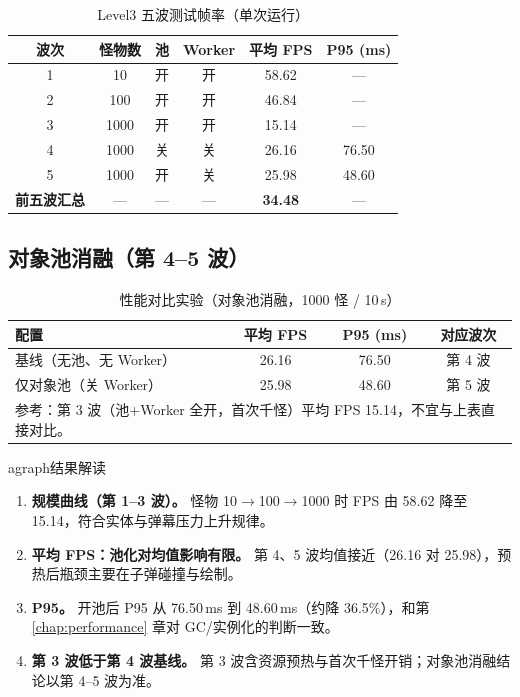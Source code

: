 \documentclass[UTF8,a4paper]{ctexart}
\begin{document}
\begin{table}[htbp]
  
  \caption{Level3 五波测试帧率（单次运行）}
  \label{tab:test-five-waves}
  \begin{tabular}{cccccc}
    \toprule
    \textbf{波次} & \textbf{怪物数} & \textbf{池} & \textbf{Worker} & \textbf{平均 FPS} & \textbf{P95 (ms)} \\
    \midrule
    1 & 10 & 开 & 开 & 58.62 & — \\
    2 & 100 & 开 & 开 & 46.84 & — \\
    3 & 1000 & 开 & 开 & 15.14 & — \\
    4 & 1000 & 关 & 关 & 26.16 & 76.50 \\
    5 & 1000 & 开 & 关 & 25.98 & 48.60 \\
    \midrule
    \textbf{前五波汇总} & — & — & — & \textbf{34.48} & — \\
    \bottomrule
  \end{tabular}
\end{table}

\subsection{对象池消融（第 4--5 波）}

\begin{table}[htbp]
  
  \caption{性能对比实验（对象池消融，1000 怪 / 10\,s）}
  \label{tab:perf}
  \begin{tabular}{lccc}
    \toprule
    \textbf{配置} & \textbf{平均 FPS} & \textbf{P95 (ms)} & \textbf{对应波次} \\
    \midrule
    基线（无池、无 Worker） & 26.16 & 76.50 & 第 4 波 \\
    仅对象池（关 Worker） & 25.98 & 48.60 & 第 5 波 \\
    \midrule
    \multicolumn{4}{l}{\footnotesize 参考：第 3 波（池+Worker 全开，首次千怪）平均 FPS 15.14，不宜与上表直接对比。} \\
    \bottomrule
  \end{tabular}
\end{table}


agraph{结果解读}
\begin{enumerate}
  \item \textbf{规模曲线（第 1--3 波）。} 怪物 10$\rightarrow$100$\rightarrow$1000 时 FPS 由 58.62 降至 15.14，符合实体与弹幕压力上升规律。
  \item \textbf{平均 FPS：池化对均值影响有限。} 第 4、5 波均值接近（26.16 对 25.98），预热后瓶颈主要在子弹碰撞与绘制。
  \item \textbf{P95。} 开池后 P95 从 76.50\,ms 到 48.60\,ms（约降 36.5\%），和第 \ref{chap:performance} 章对 GC/实例化的判断一致。
  \item \textbf{第 3 波低于第 4 波基线。} 第 3 波含资源预热与首次千怪开销；对象池消融结论以第 4--5 波为准。
\end{enumerate}
\end{document}
